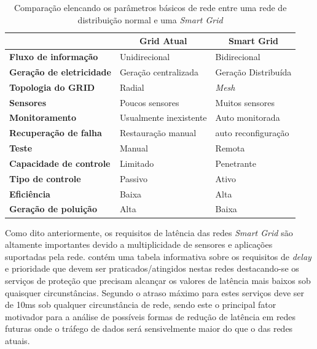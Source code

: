 \begin{table}[]
\begin{tabular}{l|l|l|}
\cline{2-3}
 & \multicolumn{1}{c|}{\textbf{Grid Atual}} & \multicolumn{1}{c|}{\textbf{Smart Grid}} \\ \hline
\multicolumn{1}{|l|}{\textbf{Fluxo de informação}} & Unidirecional & Bidirecional \\ \hline
\multicolumn{1}{|l|}{\textbf{Geração de eletricidade}} & Geração centralizada & Geração Distribuída \\ \hline
\multicolumn{1}{|l|}{\textbf{Topologia do GRID}} & Radial & \emph{Mesh} \\ \hline
\multicolumn{1}{|l|}{\textbf{Sensores}} & Poucos sensores & Muitos sensores \\ \hline
\multicolumn{1}{|l|}{\textbf{Monitoramento}} & Usualmente inexistente & Auto monitorada \\ \hline
\multicolumn{1}{|l|}{\textbf{Recuperação de falha}} & Restauração manual & auto reconfiguração \\ \hline
\multicolumn{1}{|l|}{\textbf{Teste}} & Manual & Remota \\ \hline
\multicolumn{1}{|l|}{\textbf{Capacidade de controle}} & Limitado & Penetrante \\ \hline
\multicolumn{1}{|l|}{\textbf{Tipo de controle}} & Passivo & Ativo \\ \hline
\multicolumn{1}{|l|}{\textbf{Eficiência}} & Baixa & Alta \\ \hline
\multicolumn{1}{|l|}{\textbf{Geração de poluição}} & Alta & Baixa \\ \hline
\end{tabular}
\caption[Comparação entre GRIDS normal e \emph{Smart}]{Comparação elencando os parâmetros básicos de rede entre uma rede de distribuição normal e uma \emph{Smart Grid}}
\label{tab_comparacao_grids}
\end{table}

Como dito anteriormente, os requisitos de latência das redes \emph{Smart Grid} são altamente importantes devido a multiplicidade de sensores e aplicações suportadas pela rede. \cite{Art-Deshpande2011} contém uma tabela informativa sobre os requisitos de \emph{delay} e prioridade que devem ser praticados/atingidos nestas redes destacando-se os serviços de proteção que precisam alcançar os valores de latência mais baixos sob quaisquer circunstâncias. Segundo \cite{Art-Deshpande2011} o atraso máximo para estes serviços deve ser de 10ms sob qualquer circunstância de rede, sendo este o principal fator motivador para a análise de possíveis formas de redução de latência em redes futuras onde o tráfego de dados será sensivelmente maior do que o das redes atuais.


